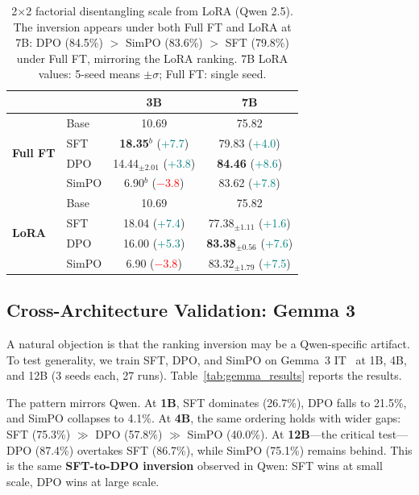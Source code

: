 \documentclass{article}
\begin{document}
\begin{table}[t]
\centering
\caption{2$\times$2 factorial disentangling scale from LoRA (Qwen 2.5). The inversion appears under both Full FT and LoRA at 7B: DPO (84.5\%) $>$ SimPO (83.6\%) $>$ SFT (79.8\%) under Full FT, mirroring the LoRA ranking. 7B LoRA values: 5-seed means $\pm \sigma$; Full FT: single seed.}
\label{tab:lora_2x2}
\small
\begin{tabular}{@{}llcc@{}}
\toprule
& & \textbf{3B} & \textbf{7B} \\
\midrule
\multirow{4}{*}{\textbf{Full FT}} & Base & 10.69 & 75.82 \\
& SFT & \textbf{18.35}$^b$ \small{(\textcolor{teal}{+7.7})} & 79.83 \small{(\textcolor{teal}{+4.0})} \\
& DPO & 14.44$_{\pm 2.01}$ \small{(\textcolor{teal}{+3.8})} & \textbf{84.46} \small{(\textcolor{teal}{+8.6})} \\
& SimPO & 6.90$^b$ \small{(\textcolor{red}{$-$3.8})} & 83.62 \small{(\textcolor{teal}{+7.8})} \\
\midrule
\multirow{4}{*}{\textbf{LoRA}} & Base & 10.69 & 75.82 \\
& SFT & 18.04 \small{(\textcolor{teal}{+7.4})} & 77.38$_{\pm 1.11}$ \small{(\textcolor{teal}{+1.6})} \\
& DPO & 16.00 \small{(\textcolor{teal}{+5.3})} & \textbf{83.38}$_{\pm 0.56}$ \small{(\textcolor{teal}{+7.6})} \\
& SimPO & 6.90 \small{(\textcolor{red}{$-$3.8})} & 83.32$_{\pm 1.79}$ \small{(\textcolor{teal}{+7.5})} \\
\bottomrule
\end{tabular}
\end{table}

\subsection{Cross-Architecture Validation: Gemma 3}
\label{sec:gemma_validation}

A natural objection is that the ranking inversion may be a Qwen-specific artifact.
To test generality, we train SFT, DPO, and SimPO on Gemma~3 IT~\citep{gemma3_2025} at 1B, 4B, and 12B (3 seeds each, 27 runs). Table~\ref{tab:gemma_results} reports the results.

The pattern mirrors Qwen. At \textbf{1B}, SFT dominates (26.7\%), DPO falls to 21.5\%, and SimPO collapses to 4.1\%. At \textbf{4B}, the same ordering holds with wider gaps: SFT (75.3\%) $\gg$ DPO (57.8\%) $\gg$ SimPO (40.0\%). At \textbf{12B}---the critical test---DPO (87.4\%) overtakes SFT (86.7\%), while SimPO (75.1\%) remains behind. This is the same \textbf{SFT-to-DPO inversion} observed in Qwen: SFT wins at small scale, DPO wins at large scale.
\end{document}
